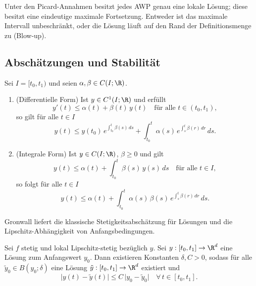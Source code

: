 \documentclass[11pt, a4paper]{article}
\begin{document}
 \begin{theorem}
Unter den Picard-Annahmen besitzt jedes AWP genau eine lokale Lösung; diese besitzt eine eindeutige maximale Fortsetzung. Entweder ist das maximale Intervall unbeschränkt, oder die Lösung läuft auf den Rand der Definitionsmenge zu (Blow-up).
\end{theorem}


\vspace{0.3cm} \par \subsection{Abschätzungen und Stabilität}

 \begin{lemma}
Sei $I = [t_0,t_1)$ und seien $\alpha,\beta \in C(I;\R)$.
\begin{enumerate}
\item (Differentielle Form) Ist $y \in C^1(I;\R)$ und erfüllt
\[
y'(t) \le \alpha(t) + \beta(t)\,y(t)
\quad \text{für alle } t \in (t_0,t_1),
\]
so gilt für alle $t \in I$
\[
y(t) \le y(t_0)\,e^{\int_{t_0}^{t} \beta(s)\,ds}
+ \int_{t_0}^{t} \alpha(s)\,
e^{\int_{s}^{t} \beta(r)\,dr}\,ds .
\]

\item (Integrale Form)
Ist $y \in C(I;\R)$, $\beta \ge 0$ und gilt
\[
y(t) \le \alpha(t) + \int_{t_0}^{t} \beta(s)\,y(s)\,ds
\quad \text{für alle } t \in I,
\]
so folgt für alle $t \in I$
\[
y(t) \le \alpha(t)
+ \int_{t_0}^{t} \alpha(s)\,\beta(s)\,
e^{\int_{s}^{t} \beta(r)\,dr}\,ds .
\]
\end{enumerate}
\end{lemma}

 \begin{corollary}
Gronwall liefert die klassische Stetigkeitsabschätzung für Lösungen und die Lipschitz-Abhängigkeit von Anfangsbedingungen.
\end{corollary}



\begin{theorem}
Sei $f$ stetig und lokal Lipschitz-stetig bezüglich $y$. 
Sei $y:[t_0,t_1]\to\R^d$ eine Lösung zum Anfangswert $y_0$.
Dann existieren Konstanten $\delta,C>0$, sodass für alle
$\tilde y_0\in B(y_0;\delta)$ eine Lösung
$\tilde y:[t_0,t_1]\to\R^d$ existiert und
\[
\lvert y(t)-\tilde y(t)\rvert
\le C\,\lvert y_0-\tilde y_0\rvert
\quad \forall\, t\in[t_0,t_1].
\]
\end{theorem}
\end{document}
